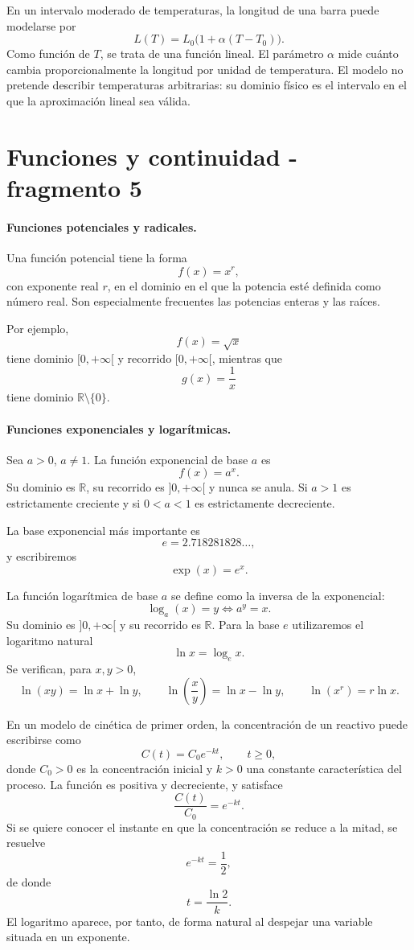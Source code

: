 \begin{example}
En un intervalo moderado de temperaturas, la longitud de una barra puede modelarse por
\[
L(T)=L_0\bigl(1+\alpha(T-T_0)\bigr).
\]
Como función de $T$, se trata de una función lineal. El parámetro $\alpha$ mide cuánto cambia proporcionalmente la longitud por unidad de temperatura. El modelo no pretende describir temperaturas arbitrarias: su dominio físico es el intervalo en el que la aproximación lineal sea válida.
\end{example}


\section{Funciones y continuidad - fragmento 5}
\paragraph{Funciones potenciales y radicales.}
Una función potencial tiene la forma
\[
f(x)=x^r,
\]
con exponente real $r$, en el dominio en el que la potencia esté definida como número real. Son especialmente frecuentes las potencias enteras y las raíces.

Por ejemplo,
\[
f(x)=\sqrt{x}
\]
tiene dominio $[0,+\infty[$ y recorrido $[0,+\infty[$, mientras que
\[
g(x)=\frac{1}{x}
\]
tiene dominio $\mathbb{R}\setminus\{0\}$.

\paragraph{Funciones exponenciales y logarítmicas.}
Sea $a>0$, $a\neq1$. La función exponencial de base $a$ es
\[
f(x)=a^x.
\]
Su dominio es $\mathbb{R}$, su recorrido es $]0,+\infty[$ y nunca se anula. Si $a>1$ es estrictamente creciente y si $0<a<1$ es estrictamente decreciente.

La base exponencial más importante es
\[
e=2.718281828\ldots,
\]
y escribiremos
\[
\exp(x)=e^x.
\]

La función logarítmica de base $a$ se define como la inversa de la exponencial:
\[
\log_a(x)=y\Longleftrightarrow a^y=x.
\]
Su dominio es $]0,+\infty[$ y su recorrido es $\mathbb{R}$. Para la base $e$ utilizaremos el logaritmo natural
\[
\ln x=\log_e x.
\]
Se verifican, para $x,y>0$,
\[
\ln(xy)=\ln x+\ln y,
\qquad
\ln\left(\frac{x}{y}\right)=\ln x-\ln y,
\qquad
\ln(x^r)=r\ln x.
\]

\begin{example}
En un modelo de cinética de primer orden, la concentración de un reactivo puede escribirse como
\[
C(t)=C_0e^{-kt},\qquad t\geq0,
\]
donde $C_0>0$ es la concentración inicial y $k>0$ una constante característica del proceso. La función es positiva y decreciente, y satisface
\[
\frac{C(t)}{C_0}=e^{-kt}.
\]
Si se quiere conocer el instante en que la concentración se reduce a la mitad, se resuelve
\[
e^{-kt}=\frac12,
\]
de donde
\[
t=\frac{\ln2}{k}.
\]
El logaritmo aparece, por tanto, de forma natural al despejar una variable situada en un exponente.
\end{example}


